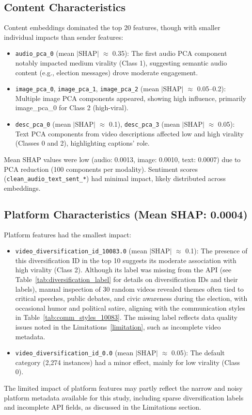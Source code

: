 \documentclass[12pt,a4paper]{report}
\begin{document}
\subsection{Content Characteristics}
Content embeddings dominated the top 20 features, though with smaller individual impacts than sender features:
\begin{itemize}
    \item \texttt{audio\_pca\_0} (mean $|$SHAP$|$ $\approx$ 0.35): The first audio PCA component notably impacted medium virality (Class 1), suggesting semantic audio content (e.g., election messages) drove moderate engagement.
    \item \texttt{image\_pca\_0}, \texttt{image\_pca\_1}, \texttt{image\_pca\_2} (mean $|$SHAP$|$ $\approx$ 0.05--0.2): Multiple image PCA components appeared, showing high influence, primarily image\_pca\_0 for Class 2 (high-viral).
    \item \texttt{desc\_pca\_0} (mean $|$SHAP$|$ $\approx$ 0.1), \texttt{desc\_pca\_3} (mean $|$SHAP$|$ $\approx$ 0.05): Text PCA components from video descriptions affected low and high virality (Classes 0 and 2), highlighting captions’ role.
\end{itemize}
Mean SHAP values were low (audio: 0.0013, image: 0.0010, text: 0.0007) due to PCA reduction (100 components per modality). Sentiment scores (\texttt{clean\_audio\_text\_sent\_*}) had minimal impact, likely distributed across embeddings.
\newpage
\subsection{Platform Characteristics (Mean SHAP: 0.0004)}
Platform features had the smallest impact:
\begin{itemize}
    \item \texttt{video\_diversification\_id\_10083.0} (mean $|$SHAP$|$ $\approx$ 0.1): The presence of this diversification ID in the top 10 suggests its moderate association with high virality (Class 2). Although its label was missing from the API (see Table~\ref{tab:diversification_label} for details on diversification IDs and their labels), manual inspection of 30 random videos revealed themes often tied to critical speeches, public debates, and civic awareness during the election, with occasional humor and political satire, aligning with the communication styles in Table~\ref{tab:comm_styles_10083}. The missing label reflects data quality issues noted in the Limitations~\ref{limitation}, such as incomplete video metadata.
    \item \texttt{video\_diversification\_id\_0.0} (mean $|$SHAP$|$ $\approx$ 0.05): The default category (2,274 instances) had a minor effect, mainly for low virality (Class 0).
\end{itemize}
The limited impact of platform features may partly reflect the narrow and noisy platform metadata available for this study, including sparse diversification labels and incomplete API fields, as discussed in the Limitations section.
\end{document}
